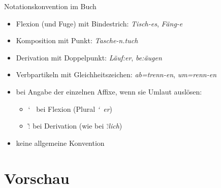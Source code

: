 \begin{frame}
  {Notationskonvention im Buch}
  \pause
  \begin{itemize}[<+->]
    \item \alert{Flexion (und Fuge)} mit Bindestrich: \textit{Tisch-es}, \textit{Fäng-e}
    \item \alert{Komposition} mit Punkt: \textit{Tasche-n.tuch}
    \item \alert{Derivation} mit Doppelpunkt: \textit{Läuf:er}, \textit{be:äugen}
    \item \alert{Verbpartikeln} mit Gleichheitszeichen: \textit{ab=trenn-en}, \textit{um=renn-en}
    \Halbzeile
    \item bei Angabe der einzelnen Affixe, wenn sie Umlaut auslösen:
      \begin{itemize}[<+->]
        \item \char`~ bei Flexion (Plural \textit{\char`~er})
        \item \~: bei Derivation (wie bei \textit{\~:lich})
      \end{itemize}
    \Halbzeile
  \item keine allgemeine Konvention
  \end{itemize}
\end{frame}

\section{Vorschau}

